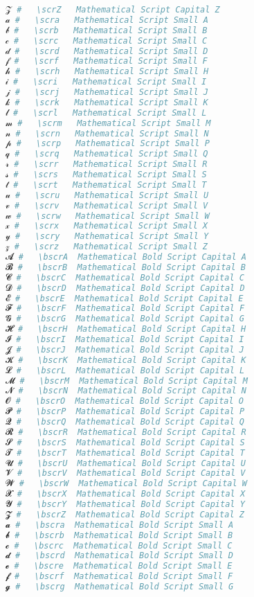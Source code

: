 \begin{lstlisting}[language=Julia]
𝒵 #   \scrZ   Mathematical Script Capital Z
𝒶 #   \scra   Mathematical Script Small A
𝒷 #   \scrb   Mathematical Script Small B
𝒸 #   \scrc   Mathematical Script Small C
𝒹 #   \scrd   Mathematical Script Small D
𝒻 #   \scrf   Mathematical Script Small F
𝒽 #   \scrh   Mathematical Script Small H
𝒾 #   \scri   Mathematical Script Small I
𝒿 #   \scrj   Mathematical Script Small J
𝓀 #   \scrk   Mathematical Script Small K
𝓁 #   \scrl   Mathematical Script Small L
𝓂 #   \scrm   Mathematical Script Small M
𝓃 #   \scrn   Mathematical Script Small N
𝓅 #   \scrp   Mathematical Script Small P
𝓆 #   \scrq   Mathematical Script Small Q
𝓇 #   \scrr   Mathematical Script Small R
𝓈 #   \scrs   Mathematical Script Small S
𝓉 #   \scrt   Mathematical Script Small T
𝓊 #   \scru   Mathematical Script Small U
𝓋 #   \scrv   Mathematical Script Small V
𝓌 #   \scrw   Mathematical Script Small W
𝓍 #   \scrx   Mathematical Script Small X
𝓎 #   \scry   Mathematical Script Small Y
𝓏 #   \scrz   Mathematical Script Small Z
𝓐 #   \bscrA  Mathematical Bold Script Capital A
𝓑 #   \bscrB  Mathematical Bold Script Capital B
𝓒 #   \bscrC  Mathematical Bold Script Capital C
𝓓 #   \bscrD  Mathematical Bold Script Capital D
𝓔 #   \bscrE  Mathematical Bold Script Capital E
𝓕 #   \bscrF  Mathematical Bold Script Capital F
𝓖 #   \bscrG  Mathematical Bold Script Capital G
𝓗 #   \bscrH  Mathematical Bold Script Capital H
𝓘 #   \bscrI  Mathematical Bold Script Capital I
𝓙 #   \bscrJ  Mathematical Bold Script Capital J
𝓚 #   \bscrK  Mathematical Bold Script Capital K
𝓛 #   \bscrL  Mathematical Bold Script Capital L
𝓜 #   \bscrM  Mathematical Bold Script Capital M
𝓝 #   \bscrN  Mathematical Bold Script Capital N
𝓞 #   \bscrO  Mathematical Bold Script Capital O
𝓟 #   \bscrP  Mathematical Bold Script Capital P
𝓠 #   \bscrQ  Mathematical Bold Script Capital Q
𝓡 #   \bscrR  Mathematical Bold Script Capital R
𝓢 #   \bscrS  Mathematical Bold Script Capital S
𝓣 #   \bscrT  Mathematical Bold Script Capital T
𝓤 #   \bscrU  Mathematical Bold Script Capital U
𝓥 #   \bscrV  Mathematical Bold Script Capital V
𝓦 #   \bscrW  Mathematical Bold Script Capital W
𝓧 #   \bscrX  Mathematical Bold Script Capital X
𝓨 #   \bscrY  Mathematical Bold Script Capital Y
𝓩 #   \bscrZ  Mathematical Bold Script Capital Z
𝓪 #   \bscra  Mathematical Bold Script Small A
𝓫 #   \bscrb  Mathematical Bold Script Small B
𝓬 #   \bscrc  Mathematical Bold Script Small C
𝓭 #   \bscrd  Mathematical Bold Script Small D
𝓮 #   \bscre  Mathematical Bold Script Small E
𝓯 #   \bscrf  Mathematical Bold Script Small F
𝓰 #   \bscrg  Mathematical Bold Script Small G

\end{lstlisting}
